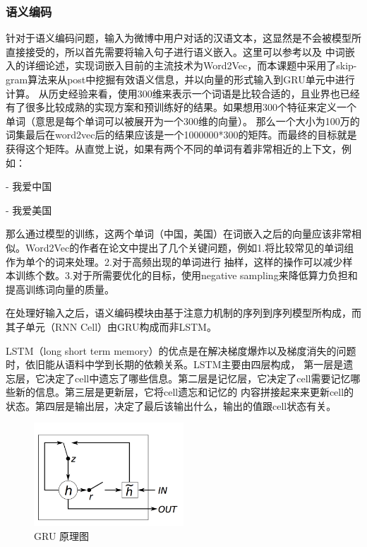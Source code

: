 \documentclass[supercite]{HustGraduPaper}
\theoremstyle{definition}
\begin{document}
\subsubsection{语义编码}
针对于语义编码问题，输入为微博中用户对话的汉语文本，这显然是不会被模型所直接接受的，所以首先需要将输入句子进行语义嵌入。这里可以参考\cite{mikolov2013efficient}以及
\cite{wordvector}中词嵌入的详细论述，实现词嵌入目前的主流技术为Word2Vec，而本课题中采用了skip-gram算法来从post中挖掘有效语义信息，并以向量的形式输入到GRU单元中进行计算。
从历史经验来看，使用300维来表示一个词语是比较合适的，且业界也已经有了很多比较成熟的实现方案和预训练好的结果。如果想用300个特征来定义一个单词（意思是每个单词可以被展开为一个300维的向量）。
那么一个大小为100万的词集最后在word2vec后的结果应该是一个1000000*300的矩阵。而最终的目标就是获得这个矩阵。从直觉上说，如果有两个不同的单词有着非常相近的上下文，例如：
\begin{shaded*}
  - 我爱中国

  - 我爱美国
\end{shaded*}


那么通过模型的训练，这两个单词（中国，美国）在词嵌入之后的向量应该非常相似。Word2Vec的作者在论文中提出了几个关键问题，例如1.将比较常见的单词组作为单个的词来处理。2.对于高频出现的单词进行
抽样，这样的操作可以减少样本训练个数。3.对于所需要优化的目标，使用negative sampling来降低算力负担和提高训练词向量的质量。


在处理好输入之后，语义编码模块由基于注意力机制的序列到序列模型所构成，而其子单元（RNN Cell）由GRU构成而非LSTM。

LSTM\cite{gers1999learning}（long short term memory）的优点是在解决梯度爆炸以及梯度消失的问题时，依旧能从语料中学到长期的依赖关系。LSTM主要由四层构成，
第一层是遗忘层，它决定了cell中遗忘了哪些信息。第二层是记忆层，它决定了cell需要记忆哪些新的信息。第三层是更新层，它将cell遗忘和记忆的
内容拼接起来来更新cell的状态。第四层是输出层，决定了最后该输出什么，输出的值跟cell状态有关。

\begin{figure}[H] %
  \centering %
  \includegraphics[width=0.5\textwidth]{images/GRU.png} %
  \caption{GRU 原理图} %
  \label{Fig.GRU} %
\end{figure}
\end{document}
